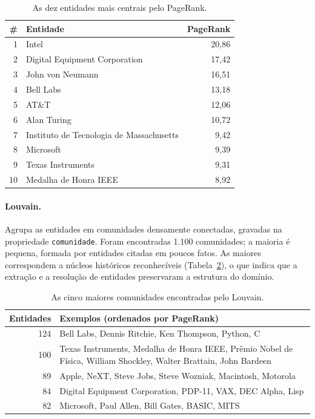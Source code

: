 \begin{table}[ht]
\centering
\caption{As dez entidades mais centrais pelo PageRank.}
\label{tab:pagerank}
\small
\begin{tabular}{rlr}
\toprule
\textbf{\#} & \textbf{Entidade} & \textbf{PageRank} \\
\midrule
1 & Intel & 20,86 \\
2 & Digital Equipment Corporation & 17,42 \\
3 & John von Neumann & 16,51 \\
4 & Bell Labs & 13,18 \\
5 & AT\&T & 12,06 \\
6 & Alan Turing & 10,72 \\
7 & Instituto de Tecnologia de Massachusetts & 9,42 \\
8 & Microsoft & 9,39 \\
9 & Texas Instruments & 9,31 \\
10 & Medalha de Honra IEEE & 8,92 \\
\bottomrule
\end{tabular}
\end{table}

\paragraph{Louvain.} Agrupa as entidades em comunidades densamente conectadas, gravadas na propriedade \texttt{comunidade}. Foram encontradas 1.100 comunidades; a maioria é pequena, formada por entidades citadas em poucos fatos. As maiores correspondem a núcleos históricos reconhecíveis (Tabela~\ref{tab:louvain}), o que indica que a extração e a resolução de entidades preservaram a estrutura do domínio.

\begin{table}[ht]
\centering
\caption{As cinco maiores comunidades encontradas pelo Louvain.}
\label{tab:louvain}
\small
\begin{tabularx}{\textwidth}{rX}
\toprule
\textbf{Entidades} & \textbf{Exemplos (ordenados por PageRank)} \\
\midrule
124 & Bell Labs, Dennis Ritchie, Ken Thompson, Python, C \\
100 & Texas Instruments, Medalha de Honra IEEE, Prêmio Nobel de Física, William Shockley, Walter Brattain, John Bardeen \\
89 & Apple, NeXT, Steve Jobs, Steve Wozniak, Macintosh, Motorola \\
84 & Digital Equipment Corporation, PDP-11, VAX, DEC Alpha, Lisp \\
82 & Microsoft, Paul Allen, Bill Gates, BASIC, MITS \\
\bottomrule
\end{tabularx}
\end{table}


